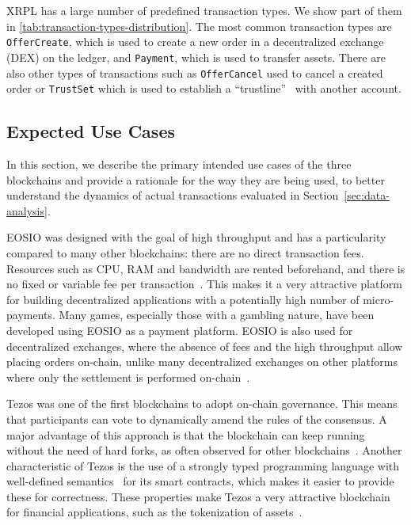 XRPL has a large number of predefined transaction types. 
We show part of them in \autoref{tab:transaction-types-distribution}. 
The most common transaction types are \texttt{OfferCreate}, which is used to create a new order in a decentralized exchange (DEX) on the ledger, and \texttt{Payment}, which is used to transfer assets. 
There are also other types of transactions such as \texttt{OfferCancel} used to cancel a created order or \texttt{TrustSet} which is used to establish a ``trustline''~\cite{xrp_ledger_overview} with another account.

\subsection{Expected Use Cases}
\label{sec:usecase}
In this section, we describe the primary intended use cases of the three blockchains and provide a rationale for the way they are being used, to better understand the dynamics of actual transactions evaluated in Section~\ref{sec:data-analysis}.

 EOSIO was designed with the goal of high throughput and has a particularity compared to many other blockchains: there are no direct transaction fees. 
Resources such as CPU, RAM and bandwidth are rented beforehand, and there is no fixed or variable fee per transaction~\cite{EOS}.
This makes it a very attractive platform for building decentralized applications with a potentially high number of micro-payments. 
Many games, especially those with a gambling nature, have been developed using EOSIO as a payment platform.
EOSIO is also used for decentralized exchanges, where the absence of fees and the high throughput allow placing orders on-chain, unlike many decentralized exchanges on other platforms where only the settlement is performed on-chain~\cite{warren20170x}.

Tezos was one of the first blockchains to adopt on-chain governance. 
This means that participants can vote to dynamically amend the rules of the consensus. 
A major advantage of this approach is that the blockchain can keep running without the need of hard forks, as often observed for other blockchains~\cite{byzantium-fork, dao-fork}. 
Another characteristic of Tezos is the use of a strongly typed programming language with well-defined semantics~\cite{NomadicLabs2018} for its smart contracts, which makes it easier to provide these for correctness. 
These properties make Tezos a very attractive blockchain for financial applications, such as the tokenization of assets~\cite{BTGPactual2019}.

